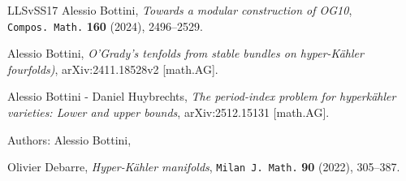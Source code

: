\documentclass[11pt]{amsart}
\theoremstyle{definition}
\theoremstyle{remark}
\begin{document}
\begin{thebibliography}{LLSvSS17}
Alessio Bottini, \emph{Towards a modular construction of OG10\/}, 
{\tt   Compos.~Math.} {\bf  160} (2024), 2496--2529.

Alessio Bottini, \emph{O'Grady's tenfolds from stable bundles on hyper-K\"ahler fourfolds)\/}, 
arXiv:2411.18528v2 [math.AG].


Alessio Bottini - Daniel Huybrechts, \emph{The period-index problem for hyperk\"ahler varieties: Lower and upper bounds\/}, 
arXiv:2512.15131  [math.AG].


Authors: Alessio Bottini, 









%

%



 Olivier Debarre, \emph{Hyper-K\"ahler manifolds\/},
 {\tt Milan J. Math.} {\bf 90} (2022),  305--387.


\end{thebibliography}
\end{document}
